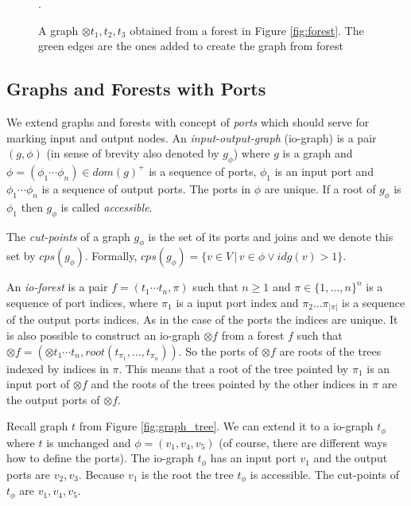 	\begin{figure}[bth]
	\begin{center}
		
		\caption{A graph $\otimes t_1,t_2,t_3$ obtained from a forest in Figure \ref{fig:forest}.
		The green edges are the ones added to create the graph from forest}.
	  \label{fig:forest_graph}
	\end{center}
	\end{figure}
\eexmp

\subsection{Graphs and Forests with Ports}
\label{subsec:gfp}

We extend graphs and forests with concept of \emph{ports} which should
serve for marking input and output nodes.
An \emph{input-output-graph} (io-graph) is a pair $(g,\phi)$ (in sense of brevity also denoted by $g_\phi$)
where $g$ is a graph and $\phi=(\phi_1 \cdots \phi_n) \in dom(g)^+$ is a sequence of ports, $\phi_1$
is an input port and $\phi_1 \cdots \phi_n$ is a sequence of output ports.
The ports in $\phi$ are unique.
If a root of $g_\phi$ is $\phi_1$ then $g_\phi$ is called \emph{accessible}.

The \emph{cut-points} of a graph $g_\phi$ is the set of its ports and joins and we denote this set by $cps(g_\phi)$.
Formally, $cps(g_\phi)=\{v \in V\,|\, v \in \phi \vee idg(v) > 1\}$.

An \emph{io-forest} is a pair $f=(t_1 \cdots t_n, \pi)$ such that $n \geq 1$ and $\pi \in \{1,\ldots,n\}^n$
is a sequence of port indices, where $\pi_1$ is a input port index and $\pi_2 \ldots \pi_{|\pi|}$ is a sequence
of the output ports indices.
As in the case of the ports the indices are unique.
It is also possible to construct an io-graph $\otimes f$ from a forest $f$ such that
$\otimes f = (\otimes t_1 \cdots t_n,root(t_{\pi_{1}},\ldots,t_{\pi_{n}}))$.
So the ports of $\otimes f$ are roots of the trees indexed by indices in $\pi$.
This means that a root of the tree pointed by $\pi_1$ is an input port of $\otimes f$ and
the roots of the trees pointed by the other indices in $\pi$ are the output ports of $\otimes f$.

\bexmp
Recall graph $t$ from Figure \ref{fig:graph_tree}.
We can extend it to a io-graph $t_\phi$ where $t$ is unchanged and
$\phi=(v_1,v_4,v_5)$ (of course, there are different ways how to define the ports).
The io-graph $t_\phi$ has an input port $v_1$ and the output ports are $v_2,v_3$.
Because $v_1$ is the root the tree $t_\phi$ is accessible.
The cut-points of $t_\phi$ are $v_1, v_4, v_5$.

